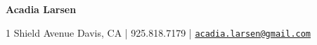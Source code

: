 \documentclass[letterpaper]{article}
\def\name{Acadia Larsen}
\renewenvironment{itemize}{
  \begin{list}{}{
    \setlength{\leftmargin}{0em}
  }
}{
  \end{list}
}
\begin{document}

\centerline{\huge \bf \name}

\vspace{0.25in}
\begin{center} 1 Shield Avenue Davis, CA  | 925.818.7179 | \href{mailto:acadia.larsen@gmail.com}{\tt acadia.larsen@gmail.com} \end{center}



\vspace{0.1in}
\end{document}

